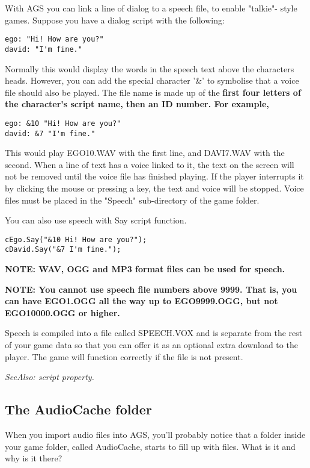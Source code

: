 With AGS you can link a line of dialog to a speech file, to enable "talkie"-
style games. Suppose you have a dialog script with the following:
\begin{verbatim}
ego: "Hi! How are you?"
david: "I'm fine."
\end{verbatim}
Normally this would display the words in the speech text above the characters
heads. However, you can add the special character '&' to symbolise that a
voice file should also be played. The file name is made up of the \bf{first four
letters} of the character's \bf{script name}, then an ID number. For example,
\begin{verbatim}
ego: &10 "Hi! How are you?"
david: &7 "I'm fine."
\end{verbatim}
This would play EGO10.WAV with the first line, and DAVI7.WAV with the second.
When a line of text has a voice linked to it, the text on the screen will not
be removed until the voice file has finished playing. If the player interrupts
it by clicking the mouse or pressing a key, the text and voice will be stopped.
Voice files must be placed in the "Speech" sub-directory of the game folder.

You can also use speech with Say script function.
\begin{verbatim}
cEgo.Say("&10 Hi! How are you?");
cDavid.Say("&7 I'm fine.");
\end{verbatim}

\bf{NOTE:} WAV, OGG and MP3 format files can be used for speech.

\bf{NOTE:} You cannot use speech file numbers above 9999. That is, you can
have EGO1.OGG all the way up to EGO9999.OGG, but not EGO10000.OGG or higher.

Speech is compiled into a file called SPEECH.VOX and is separate
from the rest of your game data so that you can offer it as an optional extra
download to the player. The game will function correctly if the file is not
present.

\it{SeeAlso:}  script property.


\subsection{The AudioCache folder}\label{AudioCache}%

When you import audio files into AGS, you'll probably notice that a folder
inside your game folder, called AudioCache, starts to fill up with files. What
is it and why is it there?

